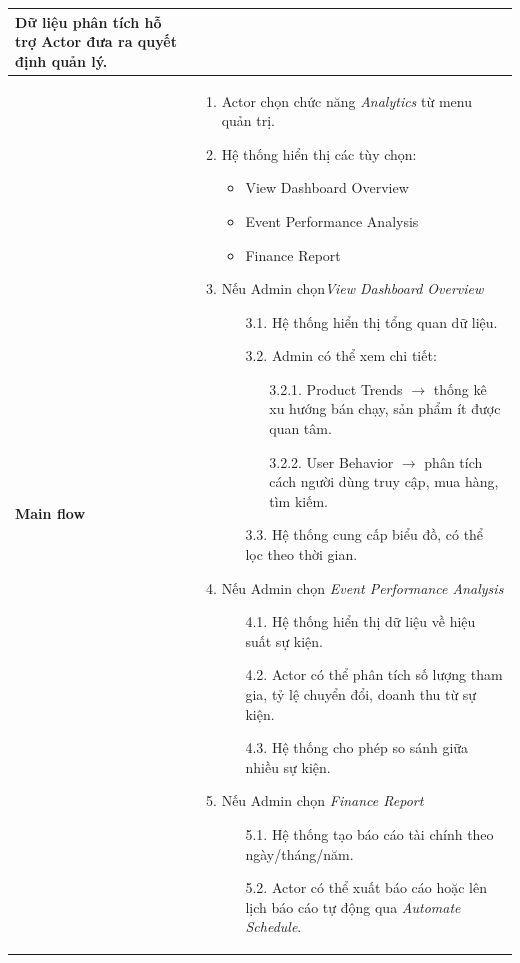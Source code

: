 \documentclass{article}
\begin{document}
\begin{table}[h!]
\begin{table}[h!]
\begin{tabular}{p{3cm} p{11cm}}
    Dữ liệu phân tích hỗ trợ Actor đưa ra quyết định quản lý. \\
\hline
\vspace{0.025cm}
\textbf{Main flow} & 
\begin{enumerate}
    \item Actor chọn chức năng \textit{Analytics} từ menu quản trị.
    \item Hệ thống hiển thị các tùy chọn:
    \begin{itemize}
        \item View Dashboard Overview
        \item Event Performance Analysis
        \item Finance Report
    \end{itemize}
    \item Nếu Admin chọn\textit{View Dashboard Overview}
    \begin{itemize}
        \item[3.1.] Hệ thống hiển thị tổng quan dữ liệu.
        \item[3.2.] Admin có thể xem chi tiết:
        \begin{itemize}
            \item[3.2.1.] Product Trends $\rightarrow$ thống kê xu hướng bán chạy, sản phẩm ít được quan tâm.
            \item[3.2.2.] User Behavior $\rightarrow$ phân tích cách người dùng truy cập, mua hàng, tìm kiếm.
        \end{itemize}
        \item[3.3.] Hệ thống cung cấp biểu đồ, có thể lọc theo thời gian.
    \end{itemize}
    \item Nếu Admin chọn \textit{Event Performance Analysis}
    \begin{itemize}
        \item[4.1.] Hệ thống hiển thị dữ liệu về hiệu suất sự kiện.
        \item[4.2.] Actor có thể phân tích số lượng tham gia, tỷ lệ chuyển đổi, doanh thu từ sự kiện.
        \item[4.3.] Hệ thống cho phép so sánh giữa nhiều sự kiện.
    \end{itemize}
    \item Nếu Admin chọn \textit{Finance Report}
    \begin{itemize}
        \item[5.1.] Hệ thống tạo báo cáo tài chính theo ngày/tháng/năm.
        \item[5.2.] Actor có thể xuất báo cáo hoặc lên lịch báo cáo tự động qua \textit{Automate Schedule}.

\end{itemize}
\end{enumerate}
\end{tabular}
\end{table}
\end{table}
\end{document}
